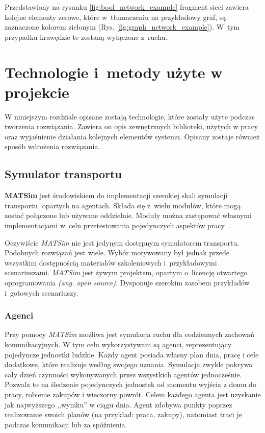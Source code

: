 \documentclass[twoside,12pt]{report}
\let\oldsection\chapter
\def\chapter{\cleardoublepage\oldsection}
\begin{document}
Przedstawiony na rysunku \ref{fig:bool_network_example} fragment sieci zawiera kolejne elementy zerowe, które w~tłumaczeniu na przykładowy graf, są zaznaczone kolorem zielonym (Rys. \ref{fig:graph_network_example}). W~tym przypadku krawędzie te zostaną wyłączone z~ruchu. 

\chapter{Technologie i~metody użyte w projekcie}\label{rozdz.technologie} 

W niniejszym rozdziale opisane zostają technologie, które zostały użyte podczas tworzenia rozwiązania. Zawiera on opis zewnętrznych biblioteki, użytych w pracy oraz wyjaśnienie działania kolejnych elementów systemu. Opisany zostaje również sposób wdrożenia rozwiązania.

\section{Symulator transportu}

\textbf{MATSim} jest środowiskiem do implementacji szerokiej skali symulacji transportu, opartych na agentach. Składa się z~wielu modułów, które mogą zostać połączone lub używane oddzielnie. Moduły można zastępować własnymi implementacjami w~celu przetestowania pojedynczych aspektów pracy~\cite{matsim}.

Oczywiście \textit{MATSim} nie jest jedynym dostępnym symulatorem transportu. Podobnych rozwiązań jest wiele. Wybór motywowany był jednak przede wszystkim dostępnością materiałów szkoleniowych i~przykładowymi scenariuszami. \textit{MATSim} jest żywym projektem, opartym o~licencję otwartego oprogramowania \textit{(ang. open source)}. Dysponuje szerokim zasobem przykładów i~gotowych scenariuszy.

\subsection{Agenci}\label{rozdz.agenci}
Przy pomocy \textit{MATSim} możliwa jest symulacja ruchu dla codziennych zachowań komunikacyjnych. W tym celu wykorzystywani są agenci, reprezentujący pojedyncze jednostki ludzkie. Każdy agent posiada własny plan dnia, pracę i cele dodatkowe, które realizuje według swojego uznania. Symulacja zwykle pokrywa cały dzień czynności wykonywanych przez wszystkich agentów jednocześnie. Pozwala to na śledzenie pojedynczych jednostek od momentu wyjścia z domu do pracy, robienie zakupów i wieczorny powrót. Celem każdego agenta jest uzyskanie jak najwyższego ,,wyniku'' w ciągu dnia. Agent zdobywa punkty poprzez realizowanie swoich planów (na przykład: praca, zakupy), natomiast traci je podczas komunikacji lub za spóźnienia.
\end{document}

